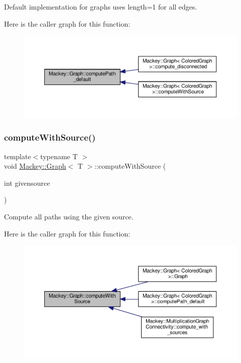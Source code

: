 Default implementation for graphs uses length=1 for all edges. 

Here is the caller graph for this function\+:\nopagebreak
\begin{figure}[H]
\begin{center}
\leavevmode
\includegraphics[width=350pt]{classMackey_1_1Graph_a61d5b1d08f8efc54fdc639c66b5aeb70_icgraph}
\end{center}
\end{figure}
\mbox{\label{classMackey_1_1Graph_acda32cd8d144dcd1ec771bd8d2753321}} 
\subsubsection{\texorpdfstring{compute\+With\+Source()}{computeWithSource()}}
{\footnotesize\ttfamily template$<$typename T $>$ \\
void \hyperlink{classMackey_1_1Graph}{Mackey\+::\+Graph}$<$ T $>$\+::compute\+With\+Source (\begin{DoxyParamCaption}\item[{int}]{givensource }\end{DoxyParamCaption})}



Compute all paths using the given source. 

Here is the caller graph for this function\+:\nopagebreak
\begin{figure}[H]
\begin{center}
\leavevmode
\includegraphics[width=350pt]{classMackey_1_1Graph_acda32cd8d144dcd1ec771bd8d2753321_icgraph}
\end{center}
\end{figure}
\mbox{\label{classMackey_1_1Graph_ab88d38f2fa1822d415ce7dac272b32dc}} 
